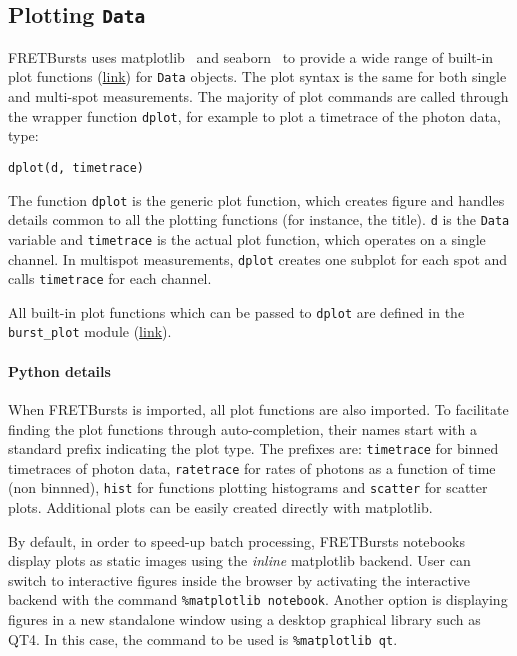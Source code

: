 \subsection{Plotting \texttt{Data}}
\label{sec:plotting}

FRETBursts uses
matplotlib~\cite{matplotlib}
and seaborn~\cite{seaborn}
to provide a wide range of built-in plot functions
(\href{http://fretbursts.readthedocs.org/en/latest/plots.html}{link})
for \verb|Data| objects.
The plot syntax is the same for both single and multi-spot measurements.
The majority of plot commands are called through the wrapper function
\verb|dplot|, for example to plot a timetrace of the photon data, type:

\begin{lstlisting}
dplot(d, timetrace)
\end{lstlisting}

The function \verb|dplot| is the generic plot function, which creates figure
and handles details common to all the plotting functions (for instance, the title).
\verb|d| is the \verb|Data| variable and \verb|timetrace| is the actual plot
function, which operates on a single channel. In multispot measurements,
\verb|dplot| creates one subplot for each spot and calls \verb|timetrace| for
each channel.

All built-in plot functions which can be passed to
\verb|dplot| are defined in the
\verb|burst_plot| module
(\href{http://fretbursts.readthedocs.org/en/latest/plots.html}{link}).

\paragraph{Python details}
When FRETBursts is imported, all plot functions are also imported.
To facilitate finding the plot functions through auto-completion,
their names start with a standard prefix indicating the
plot type. The prefixes are: \verb|timetrace| for binned timetraces
of photon data, \verb|ratetrace| for rates of photons as a function of time (non
binnned), \verb|hist| for functions plotting histograms and \verb|scatter| for
scatter plots.
Additional plots can be easily created directly with matplotlib.

By default, in order to speed-up batch processing, FRETBursts notebooks display plots
as static images using the \textit{inline} matplotlib backend.
User can switch to interactive figures inside the browser by activating
the interactive backend with the command \verb|%matplotlib notebook|.
Another option is displaying figures in a new standalone window
using a desktop graphical library such as QT4.
In this case, the command to be used is \verb|%matplotlib qt|.


